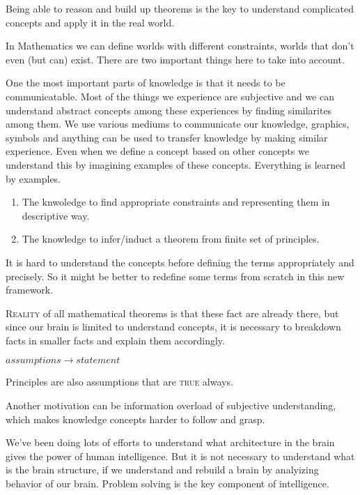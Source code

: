 \documentclass{article}
\begin{document}
Being able to reason and build up theorems is the key to understand complicated concepts and apply it in the real world. 

In Mathematics we can define worlds with different constraints, worlds that don't even (but can) exist. There are two important things here to take into account. 


One the most important parts of knowledge is that it needs to be communicatable. Most of the things we experience are subjective and we can understand abstract concepts among these experiences by finding similarites among them. We use various mediums to communicate our knowledge, graphics, symbols and anything can be used to transfer knowledge by making similar experience. Even when we define a concept based on other concepts we understand this by imagining examples of these concepts. Everything is learned by examples.

\begin{enumerate}
\item The knwoledge to find appropriate constraints and representing them in descriptive way.
\item The knowledge to infer/induct a theorem from finite set of principles.
\end{enumerate}


It is hard to understand the concepts before defining the terms appropriately and precisely. So it might be better to redefine some terms from scratch in this new framework.


\textsc{Reality} of all mathematical theorems is that these fact are already there, but since our brain is limited to understand concepts, it is necessary to breakdown facts in smaller facts and explain them accordingly.



\begin{center}\(assumptions \rightarrow statement\)\end{center}

Principles are also assumptions that are \textsc{true} always.


Another motivation can be information overload of subjective understanding, which makes knowledge concepts harder to follow and grasp.


We've been doing lots of efforts to understand what architecture in the brain gives the power of human intelligence. But it is not necessary to understand what is the brain structure, if we understand and rebuild a brain by analyizing behavior of our brain. Problem solving is the key component of intelligence. 
\end{document}
